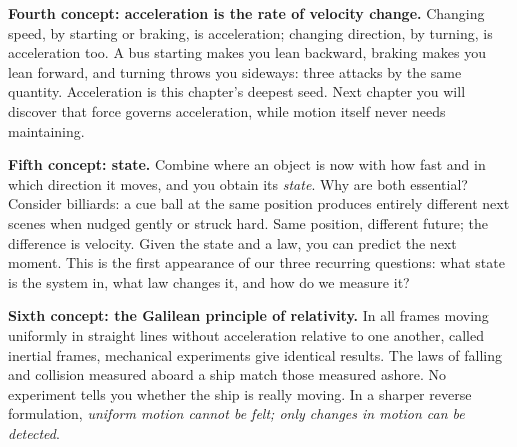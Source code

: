 \begin{mainline}
\textbf{Fourth concept: acceleration is the rate of velocity change.} Changing speed, by starting or braking, is acceleration; changing direction, by turning, is acceleration too. A bus starting makes you lean backward, braking makes you lean forward, and turning throws you sideways: three attacks by the same quantity. Acceleration is this chapter's deepest seed. Next chapter you will discover that force governs acceleration, while motion itself never needs maintaining.

\textbf{Fifth concept: state.} Combine where an object is now with how fast and in which direction it moves, and you obtain its \emph{state}. Why are both essential? Consider billiards: a cue ball at the same position produces entirely different next scenes when nudged gently or struck hard. Same position, different future; the difference is velocity. Given the state and a law, you can predict the next moment. This is the first appearance of our three recurring questions: what state is the system in, what law changes it, and how do we measure it?

\textbf{Sixth concept: the Galilean principle of relativity.} In all frames moving uniformly in straight lines without acceleration relative to one another, called inertial frames, mechanical experiments give identical results. The laws of falling and collision measured aboard a ship match those measured ashore. No experiment tells you whether the ship is really moving. In a sharper reverse formulation, \emph{uniform motion cannot be felt; only changes in motion can be detected}.
\end{mainline}

\begin{center}
\end{center}

